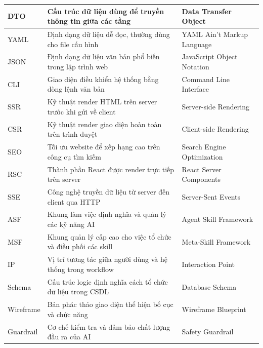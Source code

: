 \documentclass[13pt,a4paper,oneside]{extreport}
\numberwithin{equation}{chapter}
\numberwithin{figure}{chapter}
\numberwithin{table}{chapter}
\begin{document}
\begin{center}
\begin{longtable}{|>{\centering\arraybackslash}p{}|p{}|p{}|}
    DTO & Cấu trúc dữ liệu dùng để truyền thông tin giữa các tầng & Data Transfer Object \\ \hline
    YAML & Định dạng dữ liệu dễ đọc, thường dùng cho file cấu hình & YAML Ain't Markup Language \\ \hline
    JSON & Định dạng dữ liệu văn bản phổ biến trong lập trình web & JavaScript Object Notation \\ \hline
    CLI & Giao diện điều khiển hệ thống bằng dòng lệnh văn bản & Command Line Interface \\ \hline
    SSR & Kỹ thuật render HTML trên server trước khi gửi về client & Server-side Rendering \\ \hline
    CSR & Kỹ thuật render giao diện hoàn toàn trên trình duyệt & Client-side Rendering \\ \hline
    SEO & Tối ưu website để xếp hạng cao trên công cụ tìm kiếm & Search Engine Optimization \\ \hline
    RSC & Thành phần React được render trực tiếp trên server & React Server Components \\ \hline
    SSE & Công nghệ truyền dữ liệu từ server đến client qua HTTP & Server-Sent Events \\ \hline
    ASF & Khung làm việc định nghĩa và quản lý các kỹ năng AI & Agent Skill Framework \\ \hline
    MSF & Khung quản lý cấp cao cho việc tổ chức và điều phối các skill & Meta-Skill Framework \\ \hline
    IP & Vị trí tương tác giữa người dùng và hệ thống trong workflow & Interaction Point \\ \hline
    Schema & Cấu trúc logic định nghĩa cách tổ chức dữ liệu trong CSDL & Database Schema \\ \hline
    Wireframe & Bản phác thảo giao diện thể hiện bố cục và chức năng & Wireframe Blueprint \\ \hline
    Guardrail & Cơ chế kiểm tra và đảm bảo chất lượng đầu ra của AI & Safety Guardrail \\ \hline
  \end{longtable}
\end{center}

\clearpage
{}
\listoftables
\vspace{0.5cm} %

\clearpage
{}
\listoffigures

\clearpage
{}
\setcounter{page}{1}
\end{document}
